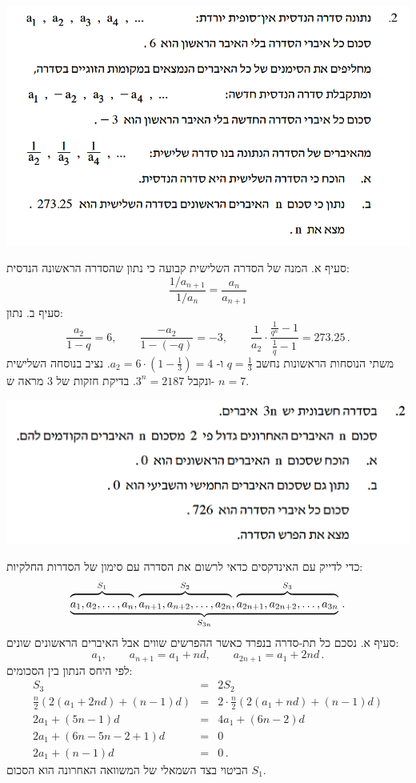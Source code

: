 \documentclass[12pt,a4paper]{article}
\begin{document}
\textbf{}
\begin{center}
\includegraphics[width=.9\textwidth]{winter-2014-2}
\end{center}
\vspace{-2ex}
סעיף א. המנה של הסדרה השלישית קבועה כי נתון שהסדרה הראשונה הנדסית:
\[
\frac{1/a_{n+1}}{1/a_n}=\frac{a_n}{a_{n+1}}
\]
סעיף ב. נתון:
\[
\frac{a_2}{1-q}=6,\quad\quad \frac{-a_2}{1-(-q)}= -3,\quad\quad \frac{1}{a_2}\cdot\frac{\displaystyle\frac{1}{q^n}-1}{\displaystyle\frac{1}{q}-1}=273.25\,.
\]
משתי הנוסחות הראשונות נחשב
$q=\frac{1}{3}$
ו-%
$a_2=6\cdot \left(1-\frac{1}{3}\right)=4$.
נציב בנוסחה השלישית ונקבל
$3^n=2187$.
בדיקת חזקות של
$3$
מראה ש-%
$n=7$.

\bigskip

\textbf{}

\begin{center}
\includegraphics[width=.9\textwidth]{summer-2014a-2}
\end{center}

כדי לדייק עם האינדקסים כדאי לרשום את הסדרה עם סימון של הסדרות החלקיות:
\[
\underbrace{
\overbrace{\rule{0pt}{8pt}a_1, a_2, \ldots, a_n}^{S_1},
\overbrace{\rule{0pt}{8pt}a_{n+1}, a_{n+2}, \ldots, a_{2n}}^{S_2},
\overbrace{\rule{0pt}{8pt}a_{2n+1}, a_{2n+2}, \ldots, a_{3n}}^{S_3}
}_{S_{3n}}\,.
\]
סעיף א. נסכם כל תת-סדרה בנפרד כאשר ההפרשים שווים אבל האיברים הראשונים שונים:
\[
a_1,\quad\quad a_{n+1} = a_1 + nd, \quad\quad a_{2n+1} = a_1 + 2nd\,.
\]
לפי היחס הנתון בין הסכומים:
\[
\renewcommand{\arraystretch}{1.2}
\begin{array}{lll}
S_3&=&2S_2\\
\frac{n}{2}(2(a_1+2nd)+(n-1)d)&=&2\cdot \frac{n}{2}(2(a_1+nd)+(n-1)d)\\
2a_1+(5n-1)d&=&4a_1+(6n-2)d\\
2a_1+(6n-5n-2+1)d&=&0\\
2a_1+(n-1)d&=&0\,.
\end{array}
\]
הביטוי בצד השמאלי של המשוואה האחרונה הוא הסכום 
$S_1$.
\end{document}

